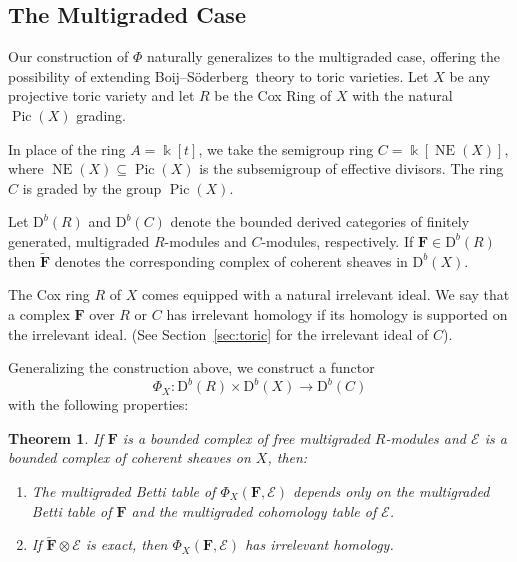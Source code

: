 \documentclass[12pt]{amsart}
\newtheorem{theorem}[lemma]{Theorem}
\theoremstyle{definition}
\theoremstyle{remark}
\newcommand{\Pic}{\operatorname{Pic}}
\newcommand{\NE}{\operatorname{NE}}
\newcommand{\Tor}{\operatorname{Tor}}
\newcommand{\kk}{\Bbbk}
\newcommand{\ZZ}{\mathbb{Z}}
\newcommand{\cE}{\mathcal{E}}
\newcommand{\FF}{\mathbf{F}}
\newcommand{\defi}[1]{\textsf{#1}} %
\newcommand{\DD}{\mathrm{D}}
\newcommand{\david}[1]{{\color{red} \sf $\clubsuit\clubsuit\clubsuit$ David: [#1]}}
\def\BS{Boij--S\"oderberg~}
\begin{document}
\subsection*{The Multigraded Case}
Our construction of $\Phi$ naturally generalizes to the multigraded case, offering the possibility of extending \BS theory to toric varieties.  Let $X$ be any projective toric variety and let $R$ be the Cox Ring of $X$ with the natural $\Pic(X)$ grading.

In place of the ring $A=\kk[t]$, we take the semigroup ring $C=\kk[\NE(X)]$, where $\NE(X)\subseteq \Pic(X)$ is the subsemigroup of effective divisors.  %
The ring $C$ is graded by the group $\Pic(X)$.


Let $\DD^b(R)$ and $\DD^b(C)$ denote the bounded derived categories of finitely generated, multigraded $R$-modules and $C$-modules, respectively.   
If $\FF\in \DD^b(R)$ then $\widetilde{\FF}$  denotes the corresponding complex of coherent sheaves in $\DD^b(X)$.  

The Cox ring $R$ of $X$ comes equipped with a natural irrelevant ideal. We say that a complex $\FF$ over $R$ or $C$ has \defi{irrelevant homology} if its homology is supported on the irrelevant ideal.  (See Section~\ref{sec:toric} for the irrelevant ideal of $C$).

Generalizing the construction above, we construct a functor
\[
\Phi_{X}: \DD^b(R)\times \DD^b(X)\to \DD^b(C)
\]
with the following properties:
\begin{theorem}\label{thm:Phimulti}
If $\FF$ is a bounded complex of free multigraded $R$-modules and $\cE$ is a bounded complex of coherent sheaves on $X$, then:
\begin{enumerate} 
	\item\label{thm:Phi':1}  The multigraded Betti table of $\Phi_{X}(\FF,\cE)$ depends only on the multigraded Betti table of $\FF$ and the multigraded cohomology table of $\cE$.
	\item\label{thm:Phi':2}  If $\widetilde{\FF}\otimes \cE$ is exact, then $\Phi_{X}(\FF,\cE)$ has irrelevant homology.  
\end{enumerate}
\end{theorem}
\end{document}
